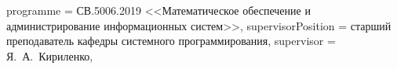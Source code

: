 {	%
	programme          = {СВ.5006.2019 <<Математическое обеспечение и администрирование информационных систем>>},
	supervisorPosition = {старший преподаватель кафедры системного программирования}, %
	supervisor         = {Я.~А.~Кириленко},
}

